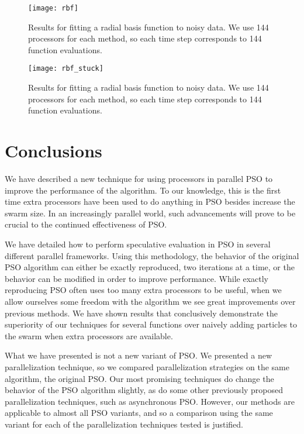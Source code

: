 \documentclass[smallcondensed]{svjour3}
\begin{document}
\begin{figure}
  \centering
  \texttt{[image: rbf]}
  \caption{Results for fitting a radial basis function to noisy data.  We use
  144 processors for each method, so each time step corresponds to 144 function
  evaluations.}
  \label{fig:rbf}
\end{figure}

\begin{figure}
  \centering
  \texttt{[image: rbf\_stuck]}
  \caption{Results for fitting a radial basis function to noisy data.  We use
  144 processors for each method, so each time step corresponds to 144 function
  evaluations.}
  \label{fig:rbf-stuck}
\end{figure}


\section{Conclusions}
\label{sec:conclusion}

We have described a new technique for using processors in parallel PSO to
improve the performance of the algorithm.  To our knowledge, this is the first
time extra processors have been used to do anything in PSO besides increase the
swarm size.  In an increasingly parallel world, such advancements will prove to
be crucial to the continued effectiveness of PSO.

We have detailed how to perform speculative evaluation in PSO in several
different parallel frameworks.  Using this methodology, the behavior of the
original PSO algorithm can either be exactly reproduced, two iterations at a
time, or the behavior can be modified in order to improve performance.  While
exactly reproducing PSO often uses too many extra processors to be useful, when
we allow ourselves some freedom with the algorithm we see great improvements
over previous methods.  We have shown results that conclusively demonstrate the
superiority of our techniques for several functions over naively adding
particles to the swarm when extra processors are available.

What we have presented is not a new variant of PSO.  We presented a new
parallelization technique, so we compared parallelization strategies on the
same algorithm, the original PSO.  Our most promising techniques do change the
behavior of the PSO algorithm slightly, as do some other previously proposed
parallelization techniques, such as asynchronous PSO.  However, our methods are
applicable to almost all PSO variants, and so a comparison using the same
variant for each of the parallelization techniques tested is justified.
\end{document}
